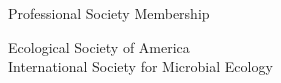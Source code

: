 \documentclass{resume} %
\begin{document}

\begin{rSection}{Professional Society Membership}

Ecological Society of America\\
International Society for Microbial Ecology

\end{rSection}

\end{document}

